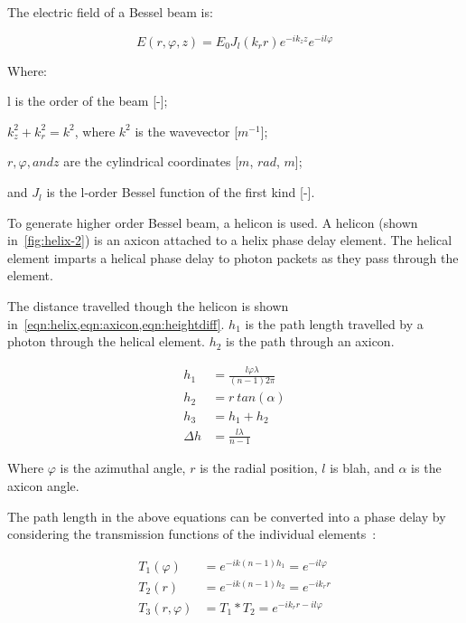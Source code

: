 The electric field of a Bessel beam is:

\begin{equation}
E(r,\varphi,z)=E_0J_l(k_r r)e^{-i k_z z}e^{-i l \varphi}
\end{equation}

\noindent Where:

\indent l is the order of the beam [-];

\indent $k_{z}^{2} + k_{r}^{2} =k^2$, where $k^2$ is the wavevector [$m^{-1}$];

\indent $r, \varphi, and z$ are the cylindrical coordinates [$m$, $rad$, $m$];

\indent and $J_l$ is the l-order Bessel function of the first kind [-].

\medskip


To generate higher order Bessel beam, a helicon is used.
A helicon (shown in~\cref{fig:helix-2}) is an axicon attached to a helix phase delay element.
The helical element imparts a helical phase delay to photon packets as they pass through the element.


The distance travelled though the helicon is shown in~\cref{eqn:helix,eqn:axicon,eqn:heightdiff}\cite{wei2015generation}.
$h_1$ is the path length travelled by a photon through the helical element.
$h_2$ is the path through an axicon.

\begin{align}
h_1&=\frac{l\varphi\lambda}{(n-1)2\pi} \label{eqn:helix}\\
h_2&=r\ tan(\alpha)\label{eqn:axicon}\\
h_3&=h_1+h_2 \label{eqn:helicon}\\
\Delta h &= \frac{l\lambda}{n-1}\label{eqn:heightdiff}
\end{align}

Where $\varphi$ is the azimuthal angle, $r$ is the radial position, $l$ is  blah, and $\alpha$ is the axicon angle.

The path length in the above equations can be converted into a phase delay by considering the transmission functions of the individual elements~\cite{khonina1992trochoson,kotlyar2006diffraction,topuzoski2009conversion,qiong2012generalization}:


\begin{align}
T_1(\varphi)&=e^{-ik(n-1)h_1}=e^{-il\varphi}\\
T_2(r)&=e^{-ik(n-1)h_2}=e^{-ik_rr}\\
T_3(r,\varphi)&=T_1*T_2=e^{-ik_rr-il\varphi}\\
\end{align}

